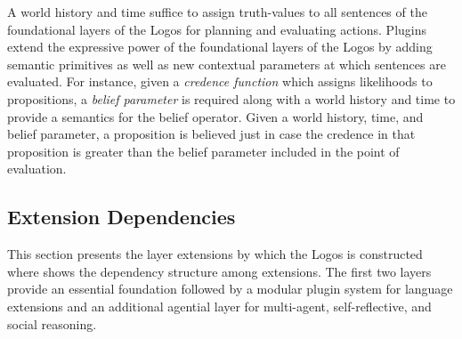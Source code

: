 \documentclass[../LogosReference.tex]{subfiles}
\begin{document}
A world history and time suffice to assign truth-values to all sentences of the foundational layers of the Logos for planning and evaluating actions.
Plugins extend the expressive power of the foundational layers of the Logos by adding semantic primitives as well as new contextual parameters at which sentences are evaluated.
For instance, given a \textit{credence function} which assigns likelihoods to propositions, a \textit{belief parameter} is required along with a world history and time to provide a semantics for the belief operator.
Given a world history, time, and belief parameter, a proposition is believed just in case the credence in that proposition is greater than the belief parameter included in the point of evaluation.



\subsection{Extension Dependencies}\label{sec:extension-dependencies}


This section presents the layer extensions by which the Logos is constructed where  shows the dependency structure among extensions.
The first two layers provide an essential foundation followed by a modular plugin system for language extensions and an additional agential layer for multi-agent, self-reflective, and social reasoning.
\end{document}
